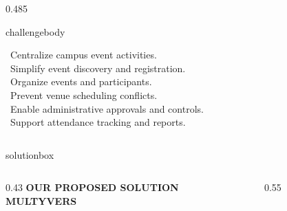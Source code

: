\documentclass[aspectratio=169,11pt]{beamer}
\begin{document}
\begin{frame}[plain]
\begin{columns}[T,onlytextwidth]
\begin{column}{0.485\textwidth}
\begin{beamercolorbox}[wd=\linewidth,rounded=true,sep=0.12cm]{challengebody}
        
        {\scriptsize
        \textcolor{cyan}{\textbullet}\ Centralize campus event activities.\\[2pt]
        \textcolor{cyan}{\textbullet}\ Simplify event discovery and registration.\\[2pt]
        \textcolor{cyan}{\textbullet}\ Organize events and participants.\\[2pt]
        \textcolor{cyan}{\textbullet}\ Prevent venue scheduling conflicts.\\[2pt]
        \textcolor{cyan}{\textbullet}\ Enable administrative approvals and controls.\\[2pt]
        \textcolor{cyan}{\textbullet}\ Support attendance tracking and reports.} \\
      \end{beamercolorbox}
    \end{column}
  \end{columns}

  \vspace{0.10cm}
  \begin{beamercolorbox}[wd=\linewidth,rounded=true,sep=0cm]{solutionbox}
    \begin{columns}[c,onlytextwidth]
      \begin{column}{0.43\textwidth}
        {\color{cyan}\bfseries\scriptsize OUR PROPOSED SOLUTION}\\[-1pt]
        {\color{white}\bfseries\large MULTYVERS}
      \end{column}
      \begin{column}{0.55\textwidth}
      \end{column}
    \end{columns}
  \end{beamercolorbox}


\end{frame}
\end{document}
